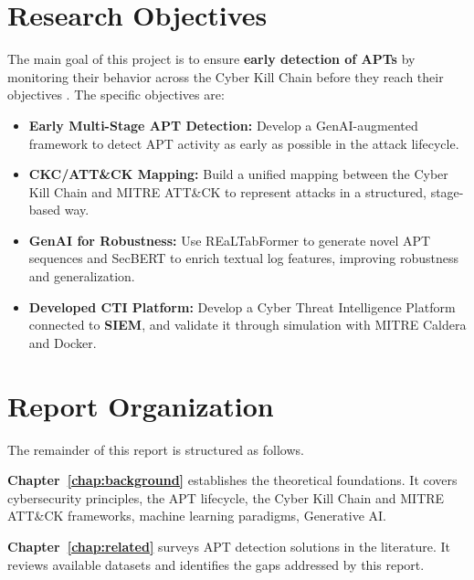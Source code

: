 \documentclass[11pt,a4paper]{report}
\begin{document}
\section*{Research Objectives}

The main goal of this project is to ensure \textbf{early detection of APTs} by monitoring
their behavior across the Cyber Kill Chain before they reach their objectives .
The specific objectives are:

\begin{itemize}

    \item \textbf{Early Multi-Stage APT Detection:}
    Develop a GenAI-augmented framework  to detect APT activity as early
    as possible in the attack lifecycle.

    \item \textbf{CKC/ATT\&CK Mapping:}
    Build a unified mapping between the Cyber Kill Chain and MITRE ATT\&CK to
    represent attacks in a structured, stage-based way.

    \item \textbf{GenAI for Robustness:}
    Use REaLTabFormer to generate novel APT sequences and SecBERT to enrich
    textual log features, improving robustness and generalization.

    \item \textbf{Developed CTI Platform:}
    Develop a Cyber Threat Intelligence Platform connected to \textbf{SIEM}, and
    validate it through simulation with MITRE Caldera and Docker.

\end{itemize}

\section*{Report Organization}

The remainder of this report is structured as follows.

\textbf{Chapter~\ref{chap:background}} establishes the theoretical foundations.
It covers cybersecurity principles, the APT lifecycle, the Cyber Kill Chain and MITRE
ATT\&CK frameworks, machine learning paradigms, Generative AI.

\textbf{Chapter~\ref{chap:related}} surveys APT detection solutions in the literature.
It reviews available datasets and identifies the gaps addressed by this report.
\end{document}
